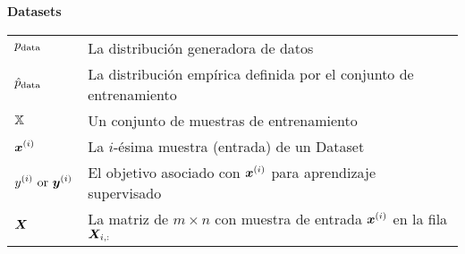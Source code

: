 \vspace{\notationgap}
\begin{minipage}{\textwidth}
\centerline{\bf Datasets}
\bgroup
\def\arraystretch{1.5}
\begin{tabular}{>{\centering}m{} p{}}
$\displaystyle p_{\rm{data}}$ & La distribución generadora de datos\\
$\displaystyle \hat{p}_{\rm{data}}$ & La distribución empírica definida por el conjunto de entrenamiento\\
$\displaystyle {\mathbb{X}}$ & Un conjunto de muestras de entrenamiento\\
$\displaystyle {\bm{x}}^{(i)}$ & La $i$-\'esima muestra (entrada) de un Dataset\\
$\displaystyle y^{(i)}\text{ or }{\bm{y}}^{(i)}$ & El objetivo asociado con ${\bm{x}}^{(i)}$ para aprendizaje supervisado\\
$\displaystyle {\bm{X}}$ & La matriz de $m \times n$ con muestra de entrada ${\bm{x}}^{(i)}$ en la fila ${\bm{X}}_{i,:}$\\
\end{tabular}
\egroup
\end{minipage}

\clearpage
